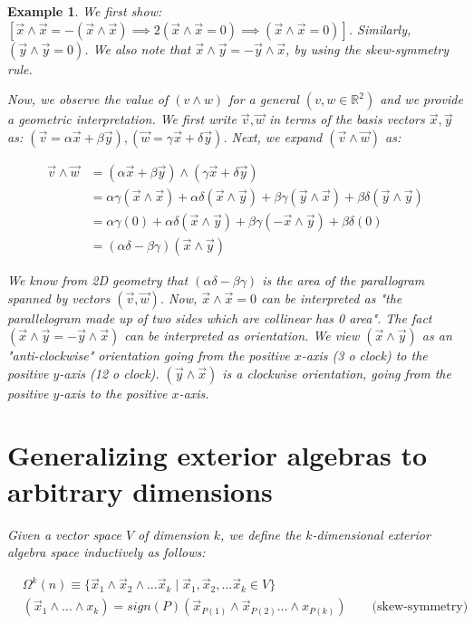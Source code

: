\documentclass[11pt]{book}
\newcommand{\R}{\ensuremath{\mathbb R}}
\newtheorem{example}[theorem]{Example}
\begin{document}
\begin{example}
We first show:
$[\vec x \wedge \vec x = - (\vec x \wedge \vec x) \implies 2 (\vec x \wedge \vec x = 0) \implies (\vec x \wedge \vec x = 0)]$.
Similarly, $(\vec y \wedge \vec y= 0)$. We also note that $\vec x \wedge \vec y = - \vec y \wedge \vec x$,
by using the skew-symmetry rule.


Now, we observe the value of $(v \wedge w)$ for a general $(v, w \in \R^2)$ and we
provide a geometric interpretation. We first write $\vec v, \vec w$ in terms
of the basis vectors $\vec x, \vec y$ as:
$(\vec v = \alpha \vec x + \beta \vec y), (\vec w = \gamma \vec x + \delta \vec y)$.
Next, we expand $(\vec v \wedge \vec w)$ as:

\begin{align*}
\vec v \wedge \vec w 
&= (\alpha \vec x + \beta \vec y) \wedge (\gamma \vec x + \delta \vec y) \\
&=       \alpha \gamma (\vec x \wedge \vec x) + 
        \alpha \delta (\vec x \wedge \vec y) + 
        \beta \gamma  (\vec y \wedge \vec x) + 
        \beta \delta  (\vec y \wedge \vec y)  \\
&= \alpha \gamma (0) + 
  \alpha \delta (\vec x \wedge \vec y)  +
  \beta \gamma (- \vec x \wedge \vec y) +
  \beta \delta (0) \\
&= (\alpha \delta - \beta \gamma)(\vec x \wedge \vec y)
\end{align*}

We know from 2D geometry that $(\alpha \delta - \beta \gamma)$ is the area
of the parallogram spanned by vectors $(\vec v, \vec w)$. Now, $\vec x \wedge \vec x = 0$
can be interpreted as "the parallelogram made up of two sides which are collinear has  0 area".
The fact $(\vec x \wedge \vec y = - \vec y \wedge \vec x)$ can be interpreted
as \emph{orientation}. We view $(\vec x \wedge \vec y)$ as an "anti-clockwise" 
orientation going from the positive $x$-axis (3 o clock) to the positive $y$-axis (12 o clock).
$(\vec y \wedge \vec x)$ is a clockwise orientation, going from the positive $y$-axis to
the positive $x$-axis.

\section{Generalizing exterior algebras to arbitrary dimensions}
Given a vector space $V$ of dimension $k$, we define the $k$-dimensional
exterior algebra space inductively as follows:

\begin{align*}
    &\Omega^k(n) \equiv \{ \vec x_1 \wedge \vec x_2 \wedge \dots \vec x_k \mid 
            \vec x_1, \vec x_2, \dots \vec x_k \in V \} \\
    & (\vec x_1 \wedge \dots \wedge x_k) = 
    sign(P)
    (\vec x_{P(1)} \wedge \vec x_{P(2)} \dots \wedge x_{P(k)})
    \qquad \text{(skew-symmetry)} \\
\end{align*}


\end{example}
\end{document}
